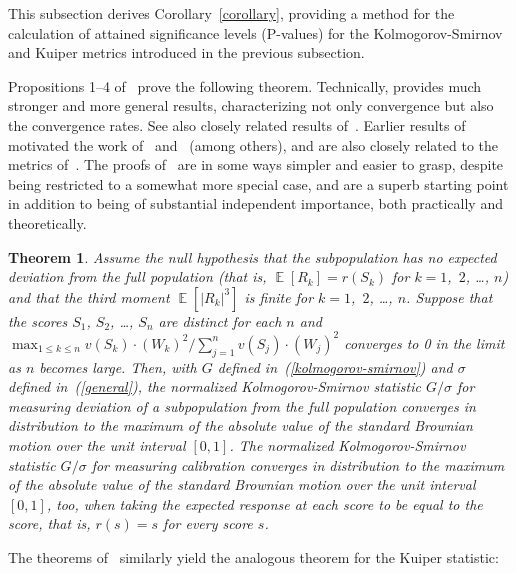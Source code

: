 \documentclass[12pt]{article}
\newtheorem{theorem}{Theorem}[]
\DeclareMathOperator{\E}{\mathop{}\mathbb{E}}
\begin{document}
This subsection derives Corollary~\ref{corollary},
providing a method for the calculation of attained significance levels
(P-values) for the Kolmogorov-Smirnov and Kuiper metrics introduced
in the previous subsection.

Propositions 1--4 of~\citet{diebolt} prove the following theorem.
Technically, \citet{diebolt} provides much stronger and more general results,
characterizing not only convergence but also the convergence rates.
See also closely related results of~\citet{stute}.
Earlier results of~\citet{delgado} motivated the work
of~\citet{diebolt} and~\citet{stute} (among others),
and are also closely related to the metrics of~\citet{tygert_two}.
The proofs of~\citet{delgado} are in some ways simpler and easier to grasp,
despite being restricted to a somewhat more special case,
and are a superb starting point in addition to being of substantial
independent importance, both practically and theoretically.

\begin{theorem}
\label{kscal}
Assume the null hypothesis that the subpopulation has no expected deviation
from the full population (that is, $\E[R_k] = r(S_k)$
for $k = 1$,~$2$, \dots, $n$) and that the third moment $\E[|R_k|^3]$ is finite
for $k = 1$,~$2$, \dots, $n$.
Suppose that the scores $S_1$, $S_2$, \dots, $S_n$ are distinct for each $n$
and
$\max_{1 \le k \le n} v(S_k) \cdot (W_k)^2 / \sum_{j=1}^n v(S_j) \cdot (W_j)^2$
converges to 0 in the limit as $n$ becomes large.
Then, with $G$ defined in~(\ref{kolmogorov-smirnov})
and $\sigma$ defined in~(\ref{general}),
the normalized Kolmogorov-Smirnov statistic $G/\sigma$
for measuring deviation of a subpopulation from the full population
converges in distribution to the maximum of the absolute value
of the standard Brownian motion over the unit interval $[0, 1]$.
The normalized Kolmogorov-Smirnov statistic $G/\sigma$
for measuring calibration converges in distribution
to the maximum of the absolute value of the standard Brownian motion
over the unit interval $[0, 1]$, too, when taking the expected response
at each score to be equal to the score, that is, $r(s) = s$
for every score $s$.
\end{theorem}

The theorems of~\citet{diebolt} similarly yield the analogous theorem
for the Kuiper statistic:
\end{document}
